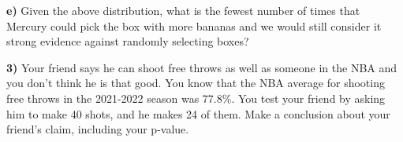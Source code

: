 \documentclass{article}
\newif\ifPrintSolution
\newcommand{\sol}[1]{\ifPrintSolution {\color{blue} #1 } \fi}
\begin{document}
\sol{We would expect it to be centered on 10. We have a $\pi$ = 0.5, \textit{n} = 20, and 0.5 $\times$ 20 = 10.}

\vspace{0.25in}

\hspace{0.1in} \textbf{e) } Given the above distribution, what is the fewest number of times that Mercury could pick the box with more bananas and we would still consider it strong evidence against randomly selecting boxes?

\sol{14 times. Above, a proportion 0f 0.70 has a p-value of 0.03, but a proportion of 0.65 has a p-value of 0.1. Strong evidence is $\le 0.05$, so we choose 0.70. With a sample size of 20, $0.7 \times 20$ = 14.}

\vspace{0.75in}

\textbf{3) } Your friend says he can shoot free throws as well as someone in the NBA and you don't think he is that good. You know that the NBA average for shooting free throws in the 2021-2022 season was 77.8$\%$. You test your friend by asking him to make 40 shots, and he makes 24 of them. Make a conclusion about your friend's claim, including your p-value.

\sol{$\hat{p} = \frac{24}{40} = 0.6$\\
$H_0: \pi = 0.778$\\
$H_a: \pi < 0.778$\\
p-value will change depending on simulation results, but should be about 0.008.\\
With a p-value of 0.008, we have very strong evidence against the null hypothesis that your friend is as good as an NBA player at making free throws.}
\end{document}
